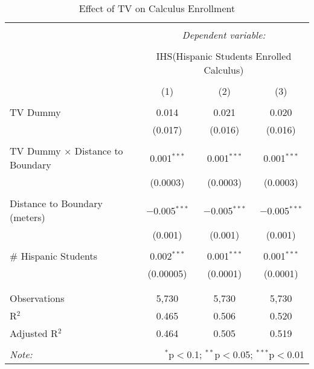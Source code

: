 
\begin{table}[!htbp] \centering 
  \caption{Effect of TV on Calculus Enrollment} 
  \label{} 
\begin{tabular}{@{\extracolsep{-2pt}}lccc} 
\\[-1.8ex]\hline 
\hline \\[-1.8ex] 
 & \multicolumn{3}{c}{\textit{Dependent variable:}} \\ 
\cline{2-4} 
\\[-1.8ex] & \multicolumn{3}{c}{IHS(Hispanic Students Enrolled Calculus)} \\ 
\\[-1.8ex] & (1) & (2) & (3)\\ 
\hline \\[-1.8ex] 
 TV Dummy & 0.014 & 0.021 & 0.020 \\ 
  & (0.017) & (0.016) & (0.016) \\ 
  & & & \\ 
 TV Dummy $\times$ Distance to Boundary & 0.001$^{***}$ & 0.001$^{***}$ & 0.001$^{***}$ \\ 
  & (0.0003) & (0.0003) & (0.0003) \\ 
  & & & \\ 
 Distance to Boundary (meters) & $-$0.005$^{***}$ & $-$0.005$^{***}$ & $-$0.005$^{***}$ \\ 
  & (0.001) & (0.001) & (0.001) \\ 
  & & & \\ 
 \# Hispanic Students & 0.002$^{***}$ & 0.001$^{***}$ & 0.001$^{***}$ \\ 
  & (0.00005) & (0.0001) & (0.0001) \\ 
  & & & \\ 
\hline \\[-1.8ex] 
Observations & 5,730 & 5,730 & 5,730 \\ 
R$^{2}$ & 0.465 & 0.506 & 0.520 \\ 
Adjusted R$^{2}$ & 0.464 & 0.505 & 0.519 \\ 
\hline 
\hline \\[-1.8ex] 
\textit{Note:}  & \multicolumn{3}{r}{$^{*}$p$<$0.1; $^{**}$p$<$0.05; $^{***}$p$<$0.01} \\ 
\end{tabular} 
\end{table} 
